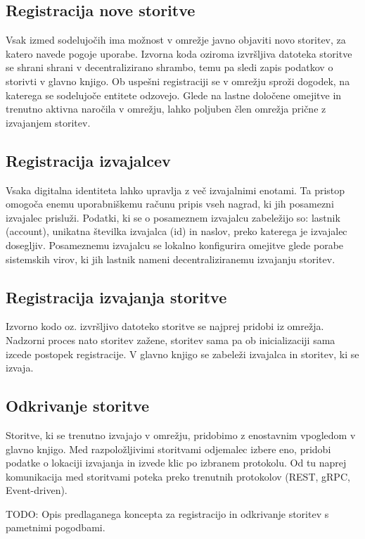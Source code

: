 \documentclass[a4paper, 12pt]{book}
\begin{document}
\subsection{Registracija nove storitve}
\label{registerService}
Vsak izmed sodelujočih ima možnost v omrežje javno objaviti novo storitev, za katero navede pogoje uporabe.
Izvorna koda oziroma izvršljiva datoteka storitve se shrani shrani v decentralizirano shrambo, temu pa sledi zapis podatkov o storivti v glavno knjigo.
Ob uspešni registraciji se v omrežju sproži dogodek, na katerega se sodelujoče entitete odzovejo.
Glede na lastne določene omejitve in trenutno aktivna naročila v omrežju, lahko poljuben člen omrežja prične z izvajanjem storitev.

\subsection{Registracija izvajalcev}
\label{registerWorker}
Vsaka digitalna identiteta lahko upravlja z več izvajalnimi enotami.
Ta pristop omogoča enemu uporabniškemu računu pripis vseh nagrad, ki jih posamezni izvajalec prisluži.
Podatki, ki se o posameznem izvajalcu zabeležijo so: lastnik (account), unikatna številka izvajalca (id) in naslov, preko katerega je izvajalec dosegljiv.
Posameznemu izvajalcu se lokalno konfigurira omejitve glede porabe sistemskih virov, ki jih lastnik nameni decentraliziranemu izvajanju storitev.

\subsection{Registracija izvajanja storitve}
\label{registerExecution}
Izvorno kodo oz. izvršljivo datoteko storitve se najprej pridobi iz omrežja.
Nadzorni proces nato storitev zažene, storitev sama pa ob inicializaciji sama izcede postopek registracije.
V glavno knjigo se zabeleži izvajalca in storitev, ki se izvaja.

\subsection{Odkrivanje storitve}
\label{serviceDiscovery}
Storitve, ki se trenutno izvajajo v omrežju, pridobimo z enostavnim vpogledom v glavno knjigo.
Med razpoložljivimi storitvami odjemalec izbere eno, pridobi podatke o lokaciji izvajanja in izvede klic po izbranem protokolu.
Od tu naprej komunikacija med storitvami poteka preko trenutnih protokolov (REST, gRPC, Event-driven).

TODO: Opis predlaganega koncepta za registracijo in odkrivanje storitev s pametnimi pogodbami.
\end{document}

